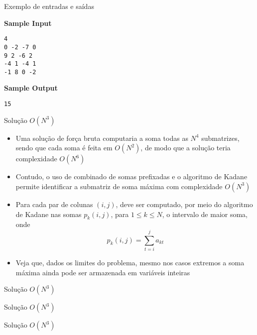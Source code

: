 \begin{frame}[fragile]{Exemplo de entradas e saídas}

\begin{minipage}[t]{0.45\textwidth}
\textbf{Sample Input}
\begin{verbatim}
4
0 -2 -7 0
9 2 -6 2
-4 1 -4 1
-1 8 0 -2
\end{verbatim}
\end{minipage}
\begin{minipage}[t]{0.5\textwidth}
\textbf{Sample Output}
\begin{verbatim}
15
\end{verbatim}
\end{minipage}
\end{frame}

\begin{frame}[fragile]{Solução $O(N^3)$}

    \begin{itemize}
        \item Uma solução de força bruta computaria a soma todas as $N^4$ submatrizes, sendo
            que cada soma é feita em $O(N^2)$, de modo que a solução teria complexidade $O(N^6)$

        \item Contudo, o uso de combinado de somas prefixadas e o algoritmo de Kadane permite
            identificar a submatriz de soma máxima com complexidade $O(N^3)$

        \item Para cada par de colunas $(i, j)$, deve ser computado, por meio do algoritmo 
            de Kadane nas somas $p_k(i, j)$, para $1\leq k\leq N$, o intervalo de maior soma,
            onde
            \[
                p_k(i, j) = \sum_{t=i}^j a_{kt}
            \]

        \item Veja que, dados os limites do problema, mesmo nos casos extremos a soma máxima ainda
            pode ser armazenada em variáveis inteiras

    \end{itemize}

\end{frame}

\begin{frame}[fragile]{Solução $O(N^3)$}
\end{frame}

\begin{frame}[fragile]{Solução $O(N^3)$}
\end{frame}

\begin{frame}[fragile]{Solução $O(N^3)$}
\end{frame}
